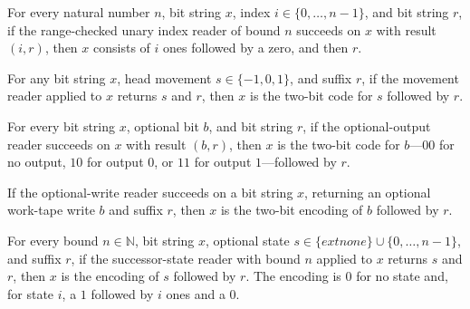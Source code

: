 \begin{lemma}
\label{Turing.codeReadFin_sound}
\leanok
{}
For every natural number $n$, bit string $x$, index $i\in\{0,\ldots,n-1\}$, and bit
string $r$, if the range-checked unary index reader of bound $n$ succeeds on $x$ with
result $(i,r)$, then $x$ consists of $i$ ones followed by a zero, and then $r$.
\end{lemma}

\begin{lemma}
\label{Turing.codeReadSign_sound}
\leanok
{}
For any bit string $x$, head movement $s\in\{-1,0,1\}$, and suffix $r$, if the movement
reader applied to $x$ returns $s$ and $r$, then $x$ is the two-bit code for $s$ followed
by $r$.
\end{lemma}

\begin{lemma}
\label{Turing.codeReadOutput_sound}
\leanok
{}
For every bit string $x$, optional bit $b$, and bit string $r$, if the optional-output
reader succeeds on $x$ with result $(b,r)$, then $x$ is the two-bit code for $b$—$00$
for no output, $10$ for output $0$, or $11$ for output $1$—followed by $r$.
\end{lemma}

\begin{lemma}
\label{Turing.codeReadWrite_sound}
\leanok
{}
If the optional-write reader succeeds on a bit string $x$, returning an optional
work-tape write $b$ and suffix $r$, then $x$ is the two-bit encoding of $b$ followed by
$r$.
\end{lemma}

\begin{lemma}
\label{Turing.codeReadState_sound}
\leanok
{}
For every bound $n\in\mathbb N$, bit string $x$, optional state
$s\in\{	ext{none}\}\cup\{0,\ldots,n-1\}$, and suffix $r$, if the successor-state reader
with bound $n$ applied to $x$ returns $s$ and $r$, then $x$ is the encoding of $s$
followed by $r$. The encoding is $0$ for no state and, for state $i$, a $1$ followed by
$i$ ones and a $0$.
\end{lemma}


